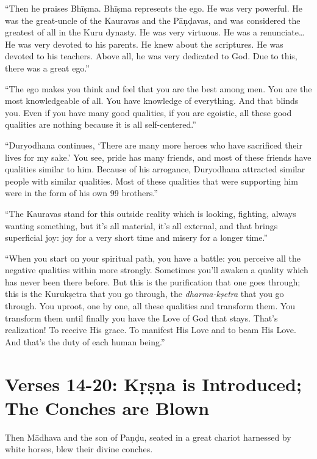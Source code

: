 \enquote{Then he praises Bhīṣma. Bhīṣma represents the ego. He was very powerful. He was the great-uncle of the Kauravas and the Pāṇḍavas, and was considered the greatest of all in the Kuru dynasty. He was very virtuous. He was a renunciate\ldots He was very devoted to his parents. He knew about the scriptures. He was devoted to his teachers. Above all, he was very dedicated to God. Due to this, there was a great ego.}

\enquote{The ego makes you think and feel that you are the best among men. You are the most knowledgeable of all. You have knowledge of everything. And that blinds you. Even if you have many good qualities, if you are egoistic, all these good qualities are nothing because it is all self-centered.}

\enquote{Duryodhana continues, \enquote{There are many more heroes who have sacrificed their lives for my sake.} You see, pride has many friends, and most of these friends have qualities similar to him. Because of his arrogance, Duryodhana attracted similar people with similar qualities. Most of these qualities that were supporting him were in the form of his own 99 brothers.}

\enquote{The Kauravas stand for this outside reality which is looking, fighting, always wanting something, but it’s all material, it’s all external, and that brings superficial joy: joy for a very short time and misery for a longer time.}

\enquote{When you start on your spiritual path, you have a battle: you perceive all the negative qualities within more strongly. Sometimes you’ll awaken a quality which has never been there before. But this is the purification that one goes through; this is the Kurukṣetra that you go through, the \textit{dharma-kṣetra} that you go through. You uproot, one by one, all these qualities and transform them. You transform them until finally you have the Love of God that stays. That’s realization! To receive His grace. To manifest His Love and to beam His Love. And that's the duty of each human being.}

\section{Verses 14-20: Kṛṣṇa is Introduced; The Conches are Blown}\label{sec-verses-14-20-krsna-is-introduced-the-conches-are-blown}

{Then Mādhava and the son of Paṇḍu, seated in a great chariot harnessed by white horses, blew their divine conches.}

